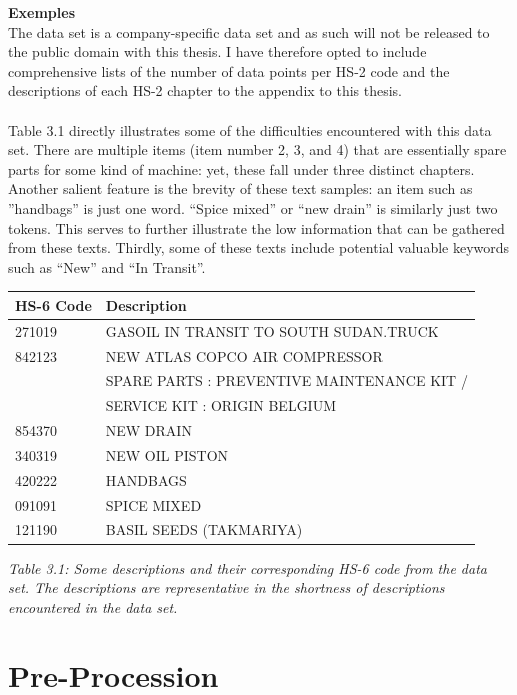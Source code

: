 \textbf{Exemples}
\\

The data set is a company-specific data set and as such will not be released to the public domain with this thesis. I have therefore opted to include comprehensive lists of the number of data points per HS-2 code and the descriptions of each HS-2 chapter to the appendix to this thesis.\\
\\

Table 3.1 directly illustrates some of the difficulties encountered with this data set. There are multiple items (item number 2, 3, and 4) that are essentially spare parts for some kind of machine: yet, these fall under three distinct chapters. Another salient feature is the brevity of these text samples: an item such as ”handbags” is just one word. “Spice mixed” or “new drain” is similarly just two tokens. This serves to further illustrate the low information that can be gathered from these texts. Thirdly, some of these texts include potential valuable keywords such as “New” and “In Transit”.



\begin{center}
    \begin{tabular}{ll} \hline
HS-6 Code & Description  \\ \hline
271019 & GASOIL IN TRANSIT TO SOUTH SUDAN.TRUCK \\
842123 & NEW ATLAS COPCO AIR COMPRESSOR \\
& SPARE PARTS : PREVENTIVE MAINTENANCE KIT / \\
& SERVICE KIT : ORIGIN BELGIUM\\
854370 & NEW DRAIN\\
340319 & NEW OIL PISTON\\
420222 & HANDBAGS\\
091091 & SPICE MIXED\\
121190 & BASIL SEEDS (TAKMARIYA)\\ \hline
	\end{tabular}
\end{center}
{\textit{Table 3.1: Some descriptions and their corresponding HS-6 code from the data set.
The descriptions are representative in the shortness of descriptions encountered in the data set.}} \\


\section{Pre-Procession}

